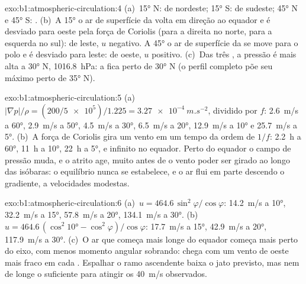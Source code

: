 \begin{solution}{exo:b1:atmospheric-circulation:4}
(a)~\ang{15} N:  de nordeste; \ang{15} S:  de sudeste; \ang{45} N e \ang{45} S: . (b)~A \ang{15} o ar de superfície da  volta em direção ao equador e é desviado
para oeste pela força de Coriolis (para a direita no norte, para a esquerda no sul): de leste, $u$
negativo. A \ang{45} o ar de superfície da  se move para o polo e é desviado para leste:
de oeste, $u$ positivo. (c)~Das três , a pressão é mais alta a \ang{30} N, \qty{1016.8}{hPa}: a
 fica perto de \ang{30} N (o perfil completo põe seu máximo perto de \ang{35} N).
\end{solution}

\begin{solution}{exo:b1:atmospheric-circulation:5}
(a)~$|\nabla p|/\rho = (200/\num{5e5})/1.225 = \qty{3.27e-4}{m.s^{-2}}$, dividido por $f$:
\qty{2.6}{m/s} a \ang{60}, \qty{2.9}{m/s} a \ang{50}, \qty{4.5}{m/s} a \ang{30}, \qty{6.5}{m/s} a
\ang{20}, \qty{12.9}{m/s} a \ang{10} e \qty{25.7}{m/s} a \ang{5}. (b)~A força de Coriolis gira um vento
em um tempo da ordem de $1/f$: \qty{2.2}{h} a \ang{60}, \qty{11}{h} a \ang{10}, \qty{22}{h} a \ang{5}, e
infinito no equador. Perto do equador o campo de pressão muda, e o atrito age, muito antes de o vento
poder ser girado ao longo das isóbaras: o equilíbrio nunca se estabelece, e o ar flui em parte descendo
o gradiente, a velocidades modestas.
\end{solution}

\begin{solution}{exo:b1:atmospheric-circulation:6}
(a)~$u = 464.6\,\sin^2\varphi/\cos\varphi$: \qty{14.2}{m/s} a \ang{10}, \qty{32.2}{m/s} a \ang{15},
\qty{57.8}{m/s} a \ang{20}, \qty{134.1}{m/s} a \ang{30}. (b)~$u = 464.6\,(\cos^2\ang{10} - \cos^2\varphi)/\cos\varphi$:
\qty{17.7}{m/s} a \ang{15}, \qty{42.9}{m/s} a \ang{20}, \qty{117.9}{m/s} a \ang{30}. (c)~O ar que
começa mais longe do equador começa mais perto do eixo, com menos momento angular sobrando: chega com
um vento de oeste mais fraco em cada . Espalhar o ramo ascendente baixa o jato previsto, mas
nem de longe o suficiente para atingir os \qty{40}{m/s} observados.
\end{solution}

